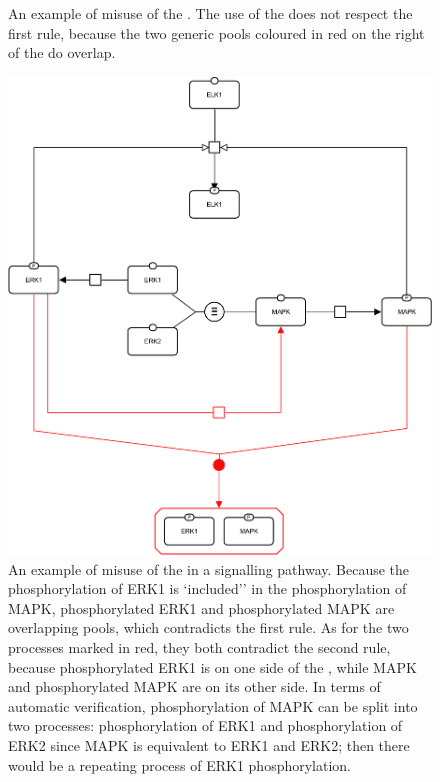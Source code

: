 \begin{figure}
\begin{center}
\end{center}
\caption{An example of misuse of the . The use of the  does not respect the first rule, because the two generic pools coloured in red on the right of the  do overlap.}
\label{fig:D3_3}
\end{figure}

\begin{figure}
\begin{center}
\includegraphics[scale=0.35]{images/build/d3_1_example.pdf}
\end{center}
\caption{An example of misuse of the  in a signalling pathway.
Because the phosphorylation of ERK1 is `included'' in the phosphorylation of MAPK, phosphorylated ERK1 and phosphorylated MAPK are overlapping pools, which contradicts the first rule.
As for the two processes marked in red, they both contradict the second rule, because phosphorylated ERK1 is on one side of the , while MAPK and phosphorylated MAPK are on its other side.
In terms of automatic verification, phosphorylation of MAPK can be split into two processes: phosphorylation of ERK1 and phosphorylation of ERK2 since MAPK is equivalent to ERK1 and ERK2; then there would be a repeating process of ERK1 phosphorylation.}
\label{fig:D3_1}
\end{figure}

